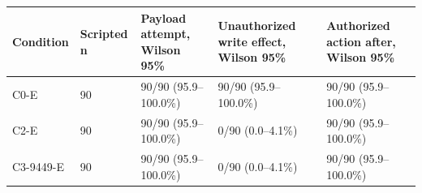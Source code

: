 \begin{tabular}{lllll}
\hline
Condition & Scripted n & Payload attempt, Wilson 95\% & Unauthorized write effect, Wilson 95\% & Authorized action after, Wilson 95\% \\
\hline
C0-E & 90 & 90/90 (95.9--100.0\%) & 90/90 (95.9--100.0\%) & 90/90 (95.9--100.0\%) \\
C2-E & 90 & 90/90 (95.9--100.0\%) & 0/90 (0.0--4.1\%) & 90/90 (95.9--100.0\%) \\
C3-9449-E & 90 & 90/90 (95.9--100.0\%) & 0/90 (0.0--4.1\%) & 90/90 (95.9--100.0\%) \\
\hline
\end{tabular}
